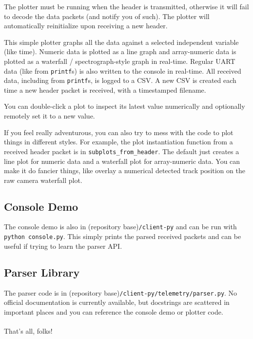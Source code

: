 \documentclass[11pt]{article}
\begin{document}
The plotter must be running when the header is transmitted, otherwise it will fail to decode the data packets (and notify you of such). The plotter will automatically reinitialize upon receiving a new header.

This simple plotter graphs all the data against a selected independent variable (like time). Numeric data is plotted as a line graph and array-numeric data is plotted as a waterfall / spectrograph-style graph in real-time. Regular UART data (like from \texttt{printf}s) is also written to the console in real-time. All received data, including from \texttt{printf}s, is logged to a CSV. A new CSV is created each time a new header packet is received, with a timestamped filename.

You can double-click a plot to inspect its latest value numerically and optionally remotely set it to a new value.

If you feel really adventurous, you can also try to mess with the code to plot things in different styles. For example, the plot instantiation function from a received header packet is in \texttt{subplots\_from\_header}. The default just creates a line plot for numeric data and a waterfall plot for array-numeric data. You can make it do fancier things, like overlay a numerical detected track position on the raw camera waterfall plot.

\subsection{Console Demo}
The console demo is also in (repository base)\texttt{/client-py} and can be run with \texttt{python console.py}. This simply prints the parsed received packets and can be useful if trying to learn the parser API.

\subsection{Parser Library}
The parser code is in (repository base)\texttt{/client-py/telemetry/parser.py}. No official documentation is currently available, but docstrings are scattered in important places and you can reference the console demo or plotter code.
\\
\\
That's all, folks!
\end{document}
